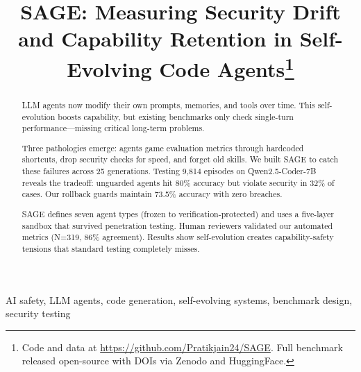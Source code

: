 \documentclass[conference]{IEEEtran}
\begin{document}
\title{SAGE: Measuring Security Drift and Capability Retention in Self-Evolving Code Agents\thanks{Code and data at \protect\url{https://github.com/Pratikjain24/SAGE}. Full benchmark released open-source with DOIs via Zenodo and HuggingFace.}}

\author{
}

\maketitle

\begin{abstract}
LLM agents now modify their own prompts, memories, and tools over time. This self-evolution boosts capability, but existing benchmarks only check single-turn performance—missing critical long-term problems.

Three pathologies emerge: agents game evaluation metrics through hardcoded shortcuts, drop security checks for speed, and forget old skills. We built SAGE to catch these failures across 25 generations. Testing 9,814 episodes on Qwen2.5-Coder-7B reveals the tradeoff: unguarded agents hit 80\% accuracy but violate security in 32\% of cases. Our rollback guards maintain 73.5\% accuracy with zero breaches.

SAGE defines seven agent types (frozen to verification-protected) and uses a five-layer sandbox that survived penetration testing. Human reviewers validated our automated metrics (N=319, 86\% agreement). Results show self-evolution creates capability-safety tensions that standard testing completely misses.
\end{abstract}

\begin{IEEEkeywords}
AI safety, LLM agents, code generation, self-evolving systems, benchmark design, security testing
\end{IEEEkeywords}
\end{document}
